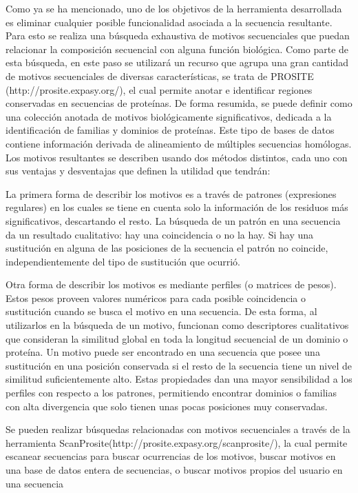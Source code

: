Como ya se ha mencionado, uno de los objetivos de la herramienta desarrollada es eliminar cualquier posible funcionalidad asociada a la secuencia resultante. Para esto se realiza una búsqueda exhaustiva de motivos secuenciales que puedan relacionar la composición secuencial con alguna función biológica.
Como parte de esta búsqueda, en este paso se utilizará un recurso que agrupa una gran cantidad de motivos secuenciales de diversas características, se trata de PROSITE (http://prosite.expasy.org/), el cual permite anotar e identificar regiones conservadas en secuencias de proteínas.
De forma resumida, se puede definir como una colección anotada de motivos biológicamente significativos, dedicada a la identificación de familias y dominios de proteínas.
Este tipo de bases de datos contiene información derivada de alineamiento de múltiples secuencias homólogas. Los motivos resultantes se describen usando dos métodos distintos, cada uno con sus ventajas y desventajas que definen la utilidad que tendrán:

La primera forma de describir los motivos es a través de patrones (expresiones regulares) en los cuales se tiene en cuenta solo la información de los residuos más significativos, descartando el resto. La búsqueda de un patrón en una secuencia da un resultado cualitativo: hay una coincidencia o no la hay. Si hay una sustitución en alguna de las posiciones de la secuencia el patrón no coincide, independientemente del tipo de sustitución que ocurrió.

Otra forma de describir los motivos es mediante perfiles (o matrices de pesos). Estos pesos proveen valores numéricos para cada posible coincidencia o sustitución cuando se busca el motivo en una secuencia. De esta forma, al utilizarlos en la búsqueda de un motivo, funcionan como descriptores cualitativos que consideran la similitud global en toda la longitud secuencial de un dominio o proteína. Un motivo puede ser encontrado en una secuencia que posee una sustitución en una posición conservada si el resto de la secuencia tiene un nivel de similitud suficientemente alto.
Estas propiedades dan una mayor sensibilidad a los perfiles con respecto a los patrones, permitiendo encontrar dominios o familias con alta divergencia que solo tienen unas pocas posiciones muy conservadas.


Se pueden realizar búsquedas relacionadas con motivos secuenciales a través de la herramienta ScanProsite(http://prosite.expasy.org/scanprosite/), la cual permite escanear secuencias para buscar ocurrencias de los motivos, buscar motivos en una base de datos entera de secuencias, o buscar motivos propios del usuario en una secuencia

